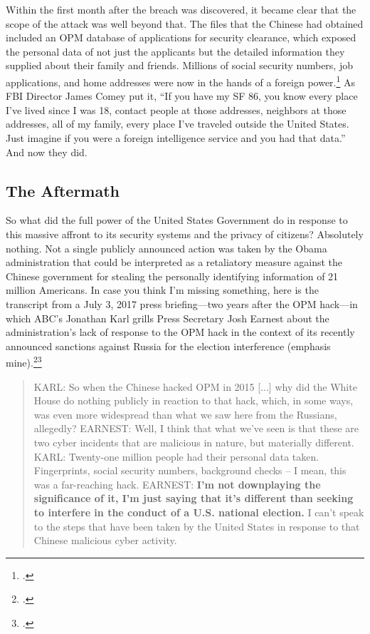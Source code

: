 \documentclass[12pt]{article}
\begin{document}
Within the first month after the breach was discovered, it became clear that the scope of the attack was well beyond that. The files that the Chinese had obtained included an OPM database of applications for security clearance, which exposed the personal data of not just the applicants but the detailed information they supplied about their family and friends. Millions of social security numbers, job applications, and home addresses were now in the hands of a foreign power.\footcite{nakashima_hacks_2015} As FBI Director James Comey put it, ``If you have my SF 86, you know every place I've lived since I was 18, contact people at those addresses, neighbors at those addresses, all of my family, every place I've traveled outside the United States. Just imagine if you were a foreign intelligence service and you had that data.'' And now they did.

\subsection{The Aftermath}
So what did the full power of the United States Government do in response to this massive affront to its security systems and the privacy of citizens? Absolutely nothing. Not a single publicly announced action was taken by the Obama administration that could be interpreted as a retaliatory measure against the Chinese government for stealing the personally identifying information of 21 million Americans.  In case you think I'm missing something, here is the transcript from a July 3, 2017 press briefing---two years after the OPM hack---in which ABC's Jonathan Karl grills Press Secretary Josh Earnest about the administration's lack of response to the OPM hack in the context of its recently announced sanctions against Russia for the election interference (emphasis mine).\footcite[Transcript adapted from the official White House website.]{earnest_press_2017}\footcite[The full exchange goes on for about 5 minutes, and you can watch the entire video here. It's pretty awkward.]{chandler_earnest_2017}

\begin{quote}
KARL: So when the Chinese hacked OPM in 2015 [...] why did the White House do nothing publicly in reaction to that hack, which, in some ways, was even more widespread than what we saw here from the Russians, allegedly?
\newline \newline
EARNEST: Well, I think that what we've seen is that these are two cyber incidents that are malicious in nature, but materially different. 
\newline \newline
KARL: Twenty-one million people had their personal data taken.  Fingerprints, social security numbers, background checks -- I mean, this was a far-reaching hack.
\newline \newline
EARNEST: \textbf{I'm not downplaying the significance of it, I'm just saying that it's different than seeking to interfere in the conduct of a U.S. national election.} I can't speak to the steps that have been taken by the United States in response to that Chinese malicious cyber activity.
\end{quote}
\end{document}
